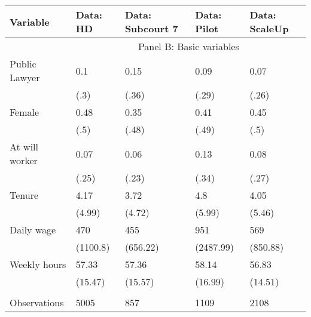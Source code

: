 \begin{tabular}{lllll}
\toprule
Variable & Data: HD & Data: Subcourt 7 & Data: Pilot & Data: ScaleUp \\
\midrule
\midrule
      & \multicolumn{4}{c}{Panel B: Basic variables} \\
\cmidrule{2-5}Public Lawyer & 0.1   & 0.15  & 0.09  & 0.07 \\
      & (.3)  & (.36) & (.29) & (.26) \\
Female & 0.48  & 0.35  & 0.41  & 0.45 \\
      & (.5)  & (.48) & (.49) & (.5) \\
At will worker & 0.07  & 0.06  & 0.13  & 0.08 \\
      & (.25) & (.23) & (.34) & (.27) \\
Tenure & 4.17  & 3.72  & 4.8   & 4.05 \\
      & (4.99) & (4.72) & (5.99) & (5.46) \\
Daily wage & 470   & 455   & 951   & 569 \\
      & (1100.8) & (656.22) & (2487.99) & (850.88) \\
Weekly hours & 57.33 & 57.36 & 58.14 & 56.83 \\
      & (15.47) & (15.57) & (16.99) & (14.51) \\
\midrule
\midrule
      &       &       &       &  \\
Observations & 5005  & 857   & 1109  & 2108 \\
\bottomrule
\end{tabular}%
